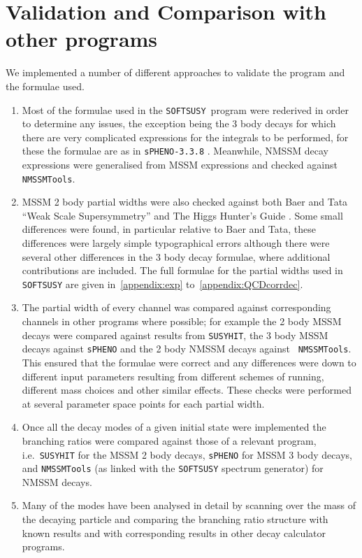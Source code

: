 \documentclass[final,3p,times]{elsarticle}
\def\SOFTSUSY{{\tt SOFTSUSY}}
\begin{document}
\section{Validation and Comparison with other programs \label{sec:comp}}

We implemented a number of different approaches to validate the program and the formulae used.
\begin{enumerate}
\item Most of the formulae used in the \SOFTSUSY~program were rederived in
  order to determine any issues, the exception being the 3 body decays for
  which there are very complicated expressions for the integrals to be
  performed, for these the formulae are as in {\tt sPHENO-3.3.8}
  \cite{Porod:2003um}. Meanwhile, NMSSM decay expressions were generalised from
  MSSM expressions and checked against {\tt NMSSMTools}. 
\item MSSM 2 body partial widths were also checked against both Baer and
  Tata ``Weak Scale Supersymmetry'' \cite{TataBaer} and The Higgs Hunter's
  Guide \cite{HHG}. Some small differences were found, in particular relative
  to Baer and Tata, these differences were largely simple typographical errors
  although there were several other differences in the 3 body decay
  formulae, where additional contributions are included. The full formulae for
  the partial widths used in {\tt SOFTSUSY} are given in~\ref{appendix:exp}
  to~\ref{appendix:QCDcorrdec}.  
\item The partial width of every channel was compared against corresponding
  channels in other programs where possible; for example the 2 body MSSM
  decays were compared against results from {\tt SUSYHIT}, the 3 body MSSM
  decays against {\tt sPHENO} and the 2 body NMSSM decays against {\tt
    NMSSMTools}. This ensured that the formulae were correct and any
  differences were down to different input parameters resulting from different
  schemes of running, different mass choices and other similar effects. These checks were performed at several parameter space points for each partial width.  
\item Once all the decay modes of a given initial state were implemented the
  branching ratios were compared against those of a relevant program, i.e.\
  {\tt SUSYHIT} for the MSSM 2 body decays, {\tt sPHENO} for MSSM 3 body
  decays, and {\tt NMSSMTools} (as linked with the {\tt SOFTSUSY} spectrum
  generator) for NMSSM decays. 
\item Many of the modes have been analysed in detail by scanning over the mass
  of the decaying particle and comparing the branching ratio structure with
  known results and with corresponding results in other decay calculator
  programs. 
\end{enumerate}
\end{document}
